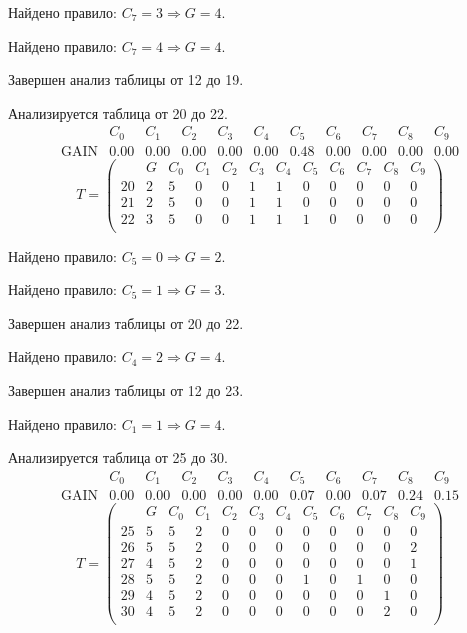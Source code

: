 Найдено правило: $C_{7} = 3 \Longrightarrow G = 4$.

Найдено правило: $C_{7} = 4 \Longrightarrow G = 4$.

Завершен анализ таблицы от 12 до 19.

Анализируется таблица от 20 до 22.
$$ 
\begin{array}{lccccc|c|cccc}
	  & C_{0} & C_{1} & C_{2} & C_{3} & C_{4} & C_{5} & C_{6} & C_{7} & C_{8} & C_{9}\\
 \textrm{GAIN} & 0.00 & 0.00 & 0.00 & 0.00 & 0.00 & 0.48 & 0.00 & 0.00 & 0.00 & 0.00
\end{array}
 $$
$$
T = \left( \begin{array}{lcccccc|c|cccc}
	 & G & C_{0} & C_{1} & C_{2} & C_{3} & C_{4} & C_{5} & C_{6} & C_{7} & C_{8} & C_{9}\\
	20 & 2 & 5 & 0 & 0 & 1 & 1 & 0 & 0 & 0 & 0 & 0\\
	21 & 2 & 5 & 0 & 0 & 1 & 1 & 0 & 0 & 0 & 0 & 0\\
	22 & 3 & 5 & 0 & 0 & 1 & 1 & 1 & 0 & 0 & 0 & 0\\
\end{array} \right)
$$

Найдено правило: $C_{5} = 0 \Longrightarrow G = 2$.

Найдено правило: $C_{5} = 1 \Longrightarrow G = 3$.

Завершен анализ таблицы от 20 до 22.

Найдено правило: $C_{4} = 2 \Longrightarrow G = 4$.

Завершен анализ таблицы от 12 до 23.

Найдено правило: $C_{1} = 1 \Longrightarrow G = 4$.

Анализируется таблица от 25 до 30.
$$ 
\begin{array}{lcccccccc|c|c}
	  & C_{0} & C_{1} & C_{2} & C_{3} & C_{4} & C_{5} & C_{6} & C_{7} & C_{8} & C_{9}\\
 \textrm{GAIN} & 0.00 & 0.00 & 0.00 & 0.00 & 0.00 & 0.07 & 0.00 & 0.07 & 0.24 & 0.15
\end{array}
 $$
$$
T = \left( \begin{array}{lccccccccc|c|c}
	 & G & C_{0} & C_{1} & C_{2} & C_{3} & C_{4} & C_{5} & C_{6} & C_{7} & C_{8} & C_{9}\\
	25 & 5 & 5 & 2 & 0 & 0 & 0 & 0 & 0 & 0 & 0 & 0\\
	26 & 5 & 5 & 2 & 0 & 0 & 0 & 0 & 0 & 0 & 0 & 2\\
	27 & 4 & 5 & 2 & 0 & 0 & 0 & 0 & 0 & 0 & 0 & 1\\
	28 & 5 & 5 & 2 & 0 & 0 & 0 & 1 & 0 & 1 & 0 & 0\\
	29 & 4 & 5 & 2 & 0 & 0 & 0 & 0 & 0 & 0 & 1 & 0\\
	30 & 4 & 5 & 2 & 0 & 0 & 0 & 0 & 0 & 0 & 2 & 0\\
\end{array} \right)
$$

